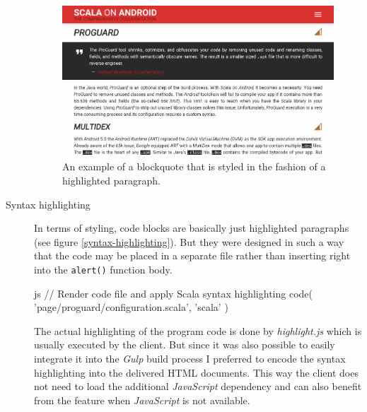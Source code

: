 \begin{description}
	\begin{figure}[]
		\includegraphics[width=\textwidth]{asset/blockquote.png}
		\caption{An example of a blockquote that is styled in the fashion of a highlighted paragraph.}
		\label{blockquote}
	\end{figure}

	\item[Syntax highlighting]\hfill

	In terms of styling, code blocks are basically just highlighted paragraphs (see figure \ref{syntax-highlighting}). But they were designed in such a way that the code may be placed in a separate file rather than inserting right into the \texttt{alert()} function body.

	\begin{code}{js}
// Render code file and apply Scala syntax highlighting
code( 'page/proguard/configuration.scala', 'scala' )
	\end{code}

	The actual highlighting of the program code is done by \textit{highlight.js} which is usually executed by the client. But since it was also possible to easily integrate it into the \textit{Gulp} build process I preferred to encode the syntax highlighting into the delivered \ac{HTML} documents. This way the client does not need to load the additional \textit{JavaScript} dependency and can also benefit from the feature when \textit{JavaScript} is not available.


\end{description}
